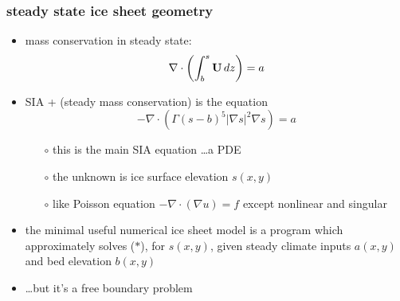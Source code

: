 \documentclass[10pt,hyperref={pdfpagelabels=true}]{beamer}
\newcommand{\Div}{\nabla\cdot}
\begin{document}
\begin{frame}
  \frametitle{steady state ice sheet geometry}

\begin{itemize}
\item mass conservation in steady state: 
  $$\Div \left(  \int_b^s {\bf U}\, dz \right)  =  a$$
\item SIA + (steady mass conservation) is the equation
\begin{equation}
- \Div \left(\Gamma (s-b)^5 | \nabla s |^2 \nabla s  \right) =  a  \tag{$\ast$}
\end{equation}
  \begin{itemize}
  \vspace{-0.2in}
  \item[$\circ$] this is the main SIA equation \dots a PDE
  \item[$\circ$] the unknown is ice surface elevation $s(x,y)$
  \item[$\circ$] like Poisson equation $-\Div (\nabla u) = f$ except nonlinear and singular
  \end{itemize}
\item the \alert{minimal useful numerical ice sheet model} is a program which approximately solves ($\ast$), for $s(x,y)$, given steady climate inputs $a(x,y)$ and bed elevation $b(x,y)$
\item \dots but it's a free boundary problem
\end{itemize}
\end{frame}
\end{document}
